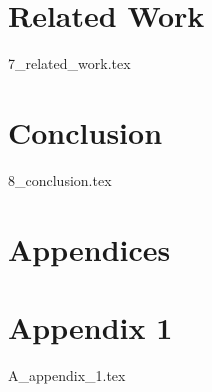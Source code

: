 \documentclass{article} %
\begin{document}

\section{Related Work}
\label{sec:related_work}
{7_related_work.tex}

\section{Conclusion}
\label{conclusion}
{8_conclusion.tex}


\newpage





\newpage
\appendix %

\section*{Appendices}
\renewcommand{\contentsname}{} %
{
  \startcontents[appendix]
}
\newpage


\section{Appendix 1}
\label{appendix1}
{A_appendix_1.tex}
\end{document}
